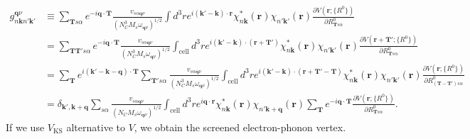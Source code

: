 \documentclass{article}
\begin{document}
\begin{align}
    g_{n\textbf{k} n'\textbf{k}'}^{\textbf{q}\nu} &\equiv
    \sum_{\textbf{T}s\alpha}
    e^{-i\textbf{q}\cdot\textbf{T}} 
    \frac{v_{s\alpha \textbf{q}\nu}}{(N_C^3 M_s \omega_{\textbf{q}\nu})^{1/2}} 
    \int d^3 r e^{i(\textbf{k}'-\textbf{k}) \cdot \textbf{r}}
    \chi_{n\textbf{k}}^*(\textbf{r})\chi_{n'\textbf{k}'}(\textbf{r})
    \frac{\partial V(\textbf{r};\{R^0\})}{\partial R^0_{\textbf{T}s\alpha}}
    \nonumber \\
    &= 
    \sum_{\textbf{T} \textbf{T}'s\alpha}
    e^{-i\textbf{q}\cdot\textbf{T}} 
    \frac{v_{s\alpha \textbf{q}\nu}}{(N_C^3 M_s \omega_{\textbf{q}\nu})^{1/2}} 
    \int_{\textrm{cell}} d^3 r
    e^{i(\textbf{k}'-\textbf{k}) \cdot (\textbf{r}+\textbf{T}')}
    \chi_{n\textbf{k}}^*(\textbf{r})\chi_{n'\textbf{k}'}(\textbf{r})
    \frac{\partial V(\textbf{r}+\textbf{T}';\{R^0\})}{\partial R^0_{\textbf{T}s\alpha}}
    \nonumber \\
    &= 
    \sum_{\textbf{T}}
    e^{i(\textbf{k}'-\textbf{k}-\textbf{q})\cdot\textbf{T}} 
    \sum_{\textbf{T}'s\alpha}
    \frac{v_{s\alpha \textbf{q}\nu}}{(N_C^3 M_s \omega_{\textbf{q}\nu})^{1/2}} 
    \int_{\textrm{cell}} d^3 r
    e^{i(\textbf{k}'-\textbf{k}) \cdot (\textbf{r}+\textbf{T}'-\textbf{T})}
    \chi_{n\textbf{k}}^*(\textbf{r})\chi_{n'\textbf{k}'}(\textbf{r})
    \frac{\partial V(\textbf{r};\{R^0\})}{\partial R^0_{(\textbf{T}-\textbf{T}')s\alpha}}
    \nonumber \\
    &= 
    \delta_{\textbf{k}',\textbf{k}+\textbf{q}}
    \sum_{s\alpha}
    \frac{v_{s\alpha \textbf{q}\nu}}{(N_C M_s \omega_{\textbf{q}\nu})^{1/2}} 
    \int_{\textrm{cell}} d^3 r
    e^{i \textbf{q} \cdot \textbf{r}}
    \chi_{n\textbf{k}}^*(\textbf{r})\chi_{n'\textbf{k}+\textbf{q}}(\textbf{r})
    \sum_{\textbf{T}}e^{-i \textbf{q} \cdot \textbf{T}}
    \frac{\partial V(\textbf{r};\{R^0\})}{\partial R^0_{\textbf{T}s\alpha}}.
\end{align}
If we use $V_{\textrm{KS}}$ alternative to $V$, we obtain the screened electron-phonon vertex.
\end{document}
